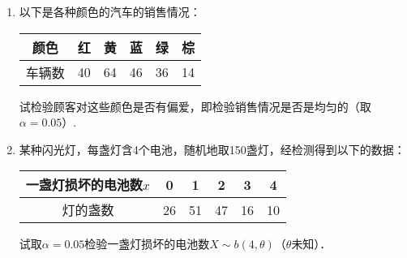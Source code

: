 \documentclass[10pt,a4paper]{article}
\begin{document}
\begin{enumerate}
    \item 以下是各种颜色的汽车的销售情况：
    \renewcommand{\arraystretch}{1.3}
    \begin{table}[H]\centering
        \begin{tabular}{c|c|c|c|c|c}
        \hline
        颜色  & 红  & 黄  & 蓝  & 绿  & 棕  \\ \hline
        车辆数 & 40 & 64 & 46 & 36 & 14 \\ \hline
        \end{tabular}
    \end{table}
    \renewcommand{\arraystretch}{1.0}
    试检验顾客对这些颜色是否有偏爱，即检验销售情况是否是均匀的（取$\alpha=0.05$）.






    \item 某种闪光灯，每盏灯含4个电池，随机地取150盏灯，经检测得到以下的数据：
    \renewcommand{\arraystretch}{1.3}
    \begin{table}[H]\centering
        \begin{tabular}{c|c|c|c|c|c}
        \hline
        一盏灯损坏的电池数$x$ & 0  & 1  & 2  & 3  & 4  \\ \hline
        灯的盏数         & 26 & 51 & 47 & 16 & 10 \\ \hline
        \end{tabular}
    \end{table}
    \renewcommand{\arraystretch}{1.0}
    试取$\alpha=0.05$检验一盏灯损坏的电池数$X\sim b(4,\theta)$（$\theta$未知）．






\end{enumerate}
\end{document}
